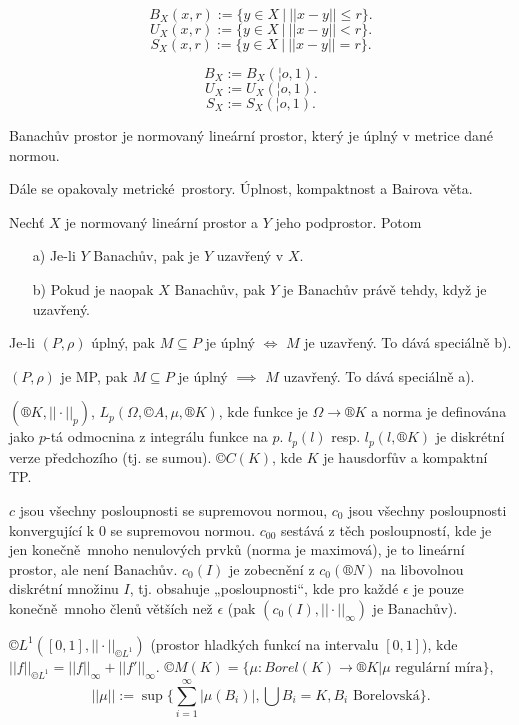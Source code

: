 \documentclass[12pt]{article}					%
\begin{document}
\begin{definice}
	$$ B_X\left(x, r\right) := \{ y \in X\ |\ ||x - y|| ≤ r \}.  $$ 
	$$ U_X\left(x, r\right) := \{ y \in X\ |\ ||x - y|| < r \}.  $$ 
	$$ S_X\left(x, r\right) := \{ y \in X\ |\ ||x - y|| = r \}.  $$ 

	$$ B_X := B_X\left(¦o, 1\right). $$ 
	$$ U_X := U_X\left(¦o, 1\right). $$ 
	$$ S_X := S_X\left(¦o, 1\right). $$ 
\end{definice}

\begin{definice}
	Banachův prostor je normovaný lineární prostor, který je úplný v metrice dané normou.
\end{definice}

Dále se opakovaly metrické prostory. Úplnost, kompaktnost a Bairova věta.

\begin{tvrzeni}
	Nechť $X$ je normovaný lineární prostor a $Y$ jeho podprostor. Potom 

	\begin{itemize}
		\item[a)] Je-li $Y$ Banachův, pak je $Y$ uzavřený v $X$.
		\item[b)] Pokud je naopak $X$ Banachův, pak $Y$ je Banachův právě tehdy, když je uzavřený.
	\end{itemize}

	\begin{dukazin}
		Je-li $\left(P,\rho\right)$ úplný, pak $M \subseteq P$ je úplný $\Leftrightarrow$ $M$ je uzavřený. To dává speciálně b).

		$\left(P, \rho\right)$ je MP, pak $M \subseteq P$ je úplný $\implies$ $M$ uzavřený. To dává speciálně a).
	\end{dukazin}
\end{tvrzeni}

\begin{priklady}
	$\left(®K, ||·||_p\right)$, $L_p(\Omega, ©A, \mu, ®K)$, kde funkce je $\Omega \rightarrow ®K$ a norma je definována jako $p$-tá odmocnina z integrálu funkce na $p$. $l_p(l)$ resp. $l_p(l, ®K)$ je diskrétní verze předchozího (tj. se sumou). $©C(K)$, kde $K$ je hausdorfův a kompaktní TP.

	$c$ jsou všechny posloupnosti se supremovou normou, $c_0$ jsou všechny posloupnosti konvergující k 0 se supremovou normou. $c_{00}$ sestává z těch posloupností, kde je jen konečně mnoho nenulových prvků (norma je maximová), je to lineární prostor, ale není Banachův. $c_0(I)$ je zobecnění z $c_0(®N)$ na libovolnou diskrétní množinu $I$, tj. obsahuje „posloupnosti“, kde pro každé $\epsilon$ je pouze konečně mnoho členů větších než $\epsilon$ (pak $(c_0(I), ||·||_∞)$ je Banachův).

	$©L^1([0, 1], || · ||_{©L^1})$ (prostor hladkých funkcí na intervalu $[0, 1]$), kde $||f||_{©L^1} = ||f||_∞ + ||f'||_∞$. $©M(K) = \{\mu : Borel(K) \rightarrow ®K | \mu \text{ regulární míra}\}$,
	$$ ||\mu|| := \sup\{\sum_{i=1}^∞|\mu(B_i)|, \bigcup B_i = K, B_i \text{ Borelovská}\}. $$
\end{priklady}
\end{document}
